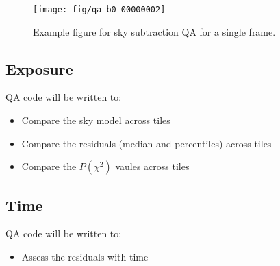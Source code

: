 \documentclass[12pt]{article}
\newenvironment{myitemize}
{ \begin{itemize}
    \setlength{\itemsep}{0pt}
    \setlength{\parskip}{0pt}
    \setlength{\parsep}{0pt}     }
{ \end{itemize}                  }
\begin{document}
\begin{figure}[htb]
\begin{center}
\texttt{[image: fig/qa-b0-00000002]}
\caption{Example figure for sky subtraction QA
for a single frame.  
}
\label{fig:skysub_frame}
\end{center}
\end{figure}


\subsection{Exposure}

QA code will be written to:

\begin{myitemize}
\item Compare the sky model across tiles 
\item Compare the residuals (median and percentiles) across tiles
\item Compare the $P(\chi^2)$ vaules across tiles
\end{myitemize}

\subsection{Time}

QA code will be written to:

\begin{myitemize}
\item Assess the residuals with time
\end{myitemize}




\def\apjl{ApJL} %
\def\aj{AJ} %
\def\apj{ApJ} %
\def\pasp{PASP} %
\def\spie{SPIE} %
\def\apjs{ApJS} %
\def\araa{ARAA} %
\def\aap{A\&A} %
\def\aaps{A\&A~Supl.} %
\def\nat{Nature} %
\def\nar{New Astron. Rev.} %
\def\mnras{MNRAS} %
\def\jcap{JCAP} %
\def\prd{{Phys.~Rev.~D}}        %
\def\physrep{{Phys.~Reports}} %



\end{document}
